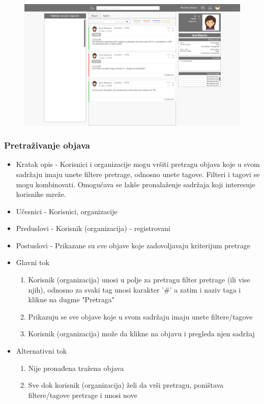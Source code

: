 \begin{figure}[h!]
		\centerline{\includegraphics[scale=0.3]{slike/pregled_profila.png}}
\end{figure}

\clearpage

\subsubsection{Pretraživanje objava}
\begin{itemize}
	\item Kratak opis - Korisnici i organizacije mogu vršiti pretragu objava koje u svom sadržaju imaju unete filtere pretrage, odnosno unete tagove. Filteri i tagovi se mogu kombinovati. Omogućava se lakše pronalaženje sadržaja koji interesuje korisnike mreže.
	\item Učesnici - Korisnici, organizacije
	\item Preduslovi - Korisnik (organizacija) - registrovani
	\item Postuslovi - Prikazane su sve objave koje zadovoljavaju kriterijum pretrage 
	\item Glavni tok
	\begin{enumerate}
		\item Korisnik (organizacija) unosi u polje za pretragu filter pretrage (ili vise njih), odnosno za svaki tag unosi karakter '\#' a zatim i naziv taga i klikne na dugme "Pretraga"
		\item Prikazuju se sve objave koje u svom sadržaju imaju unete filtere/tagove
		\item Korisnik (organizacija) može da klikne na objavu i pregleda njen sadržaj
	\end{enumerate}
	\item Alternativni tok
	\begin{enumerate}
		\item Nije pronađena tražena objava
		\item Sve dok korisnik (organizacija) želi da vrši pretragu, poništava filtere/tagove pretrage i unosi nove 
	\end{enumerate}
\end{itemize}

